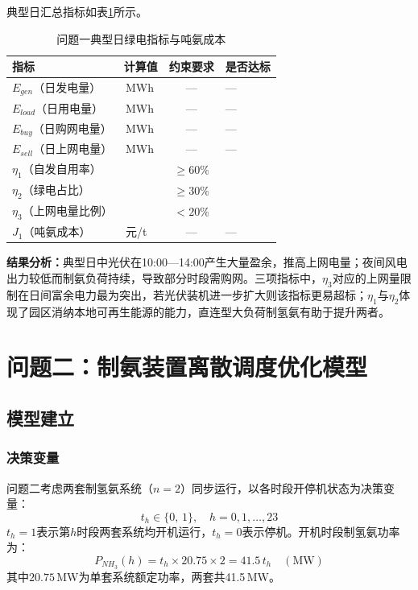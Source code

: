 \documentclass[UTF8,12pt,a4paper]{ctexart}
\newcommand{\blank}[1]{\underline{\makebox[#1][c]{}}}
\newcommand{\RES}{\blank{2cm}}          %
\begin{document}
典型日汇总指标如表\ref{tab:p1_results}所示。

\begin{table}[htbp]
\centering
\caption{问题一典型日绿电指标与吨氨成本}
\label{tab:p1_results}
\begin{tabular}{llcl}
\toprule
\textbf{指标} & \textbf{计算值} & \textbf{约束要求} & \textbf{是否达标} \\
\midrule
$E_{gen}$（日发电量） & \RES\,MWh & — & — \\
$E_{load}$（日用电量） & \RES\,MWh & — & — \\
$E_{buy}$（日购网电量） & \RES\,MWh & — & — \\
$E_{sell}$（日上网电量） & \RES\,MWh & — & — \\
$\eta_1$（自发自用率） & \RES & $\geq60\%$ & \RES \\
$\eta_2$（绿电占比） & \RES & $\geq30\%$ & \RES \\
$\eta_3$（上网电量比例） & \RES & $<20\%$ & \RES \\
$J_1$（吨氨成本） & \RES\,元/t & — & — \\
\bottomrule
\end{tabular}
\end{table}

\noindent\textbf{结果分析：}典型日中光伏在10:00—14:00产生大量盈余，推高上网电量；夜间风电出力较低而制氨负荷持续，导致部分时段需购网。三项指标中，$\eta_3$对应的上网量限制在日间富余电力最为突出，若光伏装机进一步扩大则该指标更易超标；$\eta_1$与$\eta_2$体现了园区消纳本地可再生能源的能力，直连型大负荷制氢氨有助于提升两者。

\section{问题二：制氨装置离散调度优化模型}

\subsection{模型建立}

\subsubsection{决策变量}

问题二考虑两套制氢氨系统（$n=2$）同步运行，以各时段开停机状态为决策变量：
\begin{equation}
  t_h \in \{0,\,1\}, \quad h = 0,1,\ldots,23
  \label{eq:p2var}
\end{equation}
$t_h=1$表示第$h$时段两套系统均开机运行，$t_h=0$表示停机。开机时段制氢氨功率为：
\begin{equation}
  P_{NH_3}(h) = t_h \times 20.75 \times 2 = 41.5\,t_h \quad (\text{MW})
\end{equation}
其中$20.75$\,MW为单套系统额定功率，两套共41.5\,MW。
\end{document}
